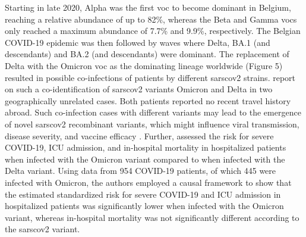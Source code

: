 Starting in late 2020, Alpha was the first \gls{voc} to become dominant in Belgium, reaching a relative abundance of up to 82\%, whereas the Beta and Gamma \gls{voc}s only reached a maximum abundance of 7.7\% and 9.9\%, respectively.
The Belgian COVID-19 epidemic was then followed by waves where Delta, BA.1 (and descendants) and BA.2 (and descendants) were dominant.
The replacement of Delta with the Omicron \gls{voc} as the dominating lineage worldwide (Figure 5) resulted in possible co-infections of patients by different \gls{sarscov2} strains.
\citet{wawina-bokalanga2022genomic} report on such a co-identification of \gls{sarscov2} variants Omicron and Delta in two geographically unrelated cases.
Both patients reported no recent travel history abroad.
Such co-infection cases with different variants may lead to the emergence of novel \gls{sarscov2} recombinant variants, which might influence viral transmission, disease severity, and vaccine efficacy \citep{rehman2020evolutionary}.
Further, \citet{vangoethem2022clinical} assessed the risk for severe COVID-19, ICU admission, and in-hospital mortality in hospitalized patients when infected with the Omicron variant compared to when infected with the Delta variant.
Using data from 954 COVID-19 patients, of which 445 were infected with Omicron, the authors employed a causal framework to show that the estimated standardized risk for severe COVID-19 and ICU admission in hospitalized patients was significantly lower when infected with the Omicron variant, whereas in-hospital mortality was not significantly different according to the \gls{sarscov2} variant.


